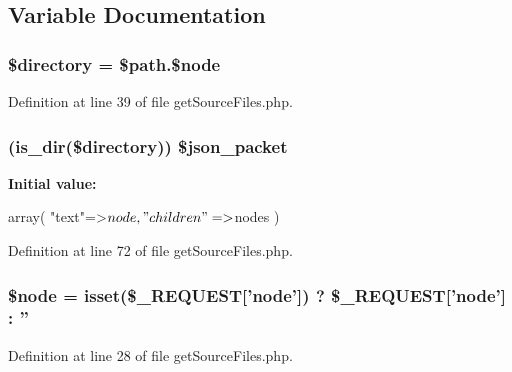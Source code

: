 \subsection{\-Variable \-Documentation}
\hypertarget{get_source_files_8php_a1b07c630eb02f770a082a013373a16d6}{
\subsubsection[{\$directory}]{\setlength{\rightskip}{0pt plus 5cm}\$directory = \$path.\$node}}\label{get_source_files_8php_a1b07c630eb02f770a082a013373a16d6}


\-Definition at line 39 of file get\-Source\-Files.\-php.

\hypertarget{get_source_files_8php_a108774637bb95516727a0c29e580525e}{
\subsubsection[{\$json\-\_\-packet}]{ (is\-\_\-dir(\$directory)) \$json\-\_\-packet}}\label{get_source_files_8php_a108774637bb95516727a0c29e580525e}
{\bfseries \-Initial value\-:}
\begin{DoxyCode}
 array(
    "text"=>$node,
    "children"=>$nodes
)
\end{DoxyCode}


\-Definition at line 72 of file get\-Source\-Files.\-php.

\hypertarget{get_source_files_8php_a15955933e72700564e1a76d7f97c1ac7}{
\subsubsection[{\$node}]{\setlength{\rightskip}{0pt plus 5cm}\$node = isset(\$\-\_\-\-R\-E\-Q\-U\-E\-S\-T\mbox{[}'node'\mbox{]}) ? \$\-\_\-\-R\-E\-Q\-U\-E\-S\-T\mbox{[}'node'\mbox{]} \-: ''}}\label{get_source_files_8php_a15955933e72700564e1a76d7f97c1ac7}


\-Definition at line 28 of file get\-Source\-Files.\-php.

